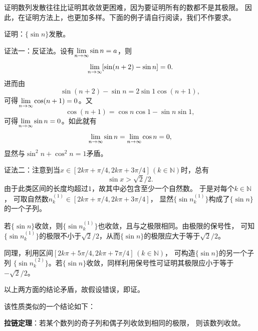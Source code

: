 \begin{shaded}
	证明数列发散往往比证明其收敛更困难，因为要证明所有的数都不是其极限。
	因此，在证明方法上，也更加多样。下面的例子请自行阅读，我们不作要求。

	\egz 证明：$\{\sin n\}$发散。

	
	证法一：反证法。设有$\lim\limits_{n\to\infty}\sin n=a$，则
	$$\lim\limits_{n\to\infty}[\sin(n+2)-\sin n]=0.$$
	进而由
	$$\sin(n+2)-\sin n=2\sin 1\cos(n+1),$$
	可得$\lim\limits_{n\to\infty}\cos(n+1)=0$。又
	$$\cos(n+1)=\cos n\cos 1-\sin n\sin 1,$$
	可得$\lim\limits_{n\to\infty}\sin n=0$。如此就有
	$$\lim\limits_{n\to\infty}\sin n=\lim\limits_{n\to\infty}\cos n=0,$$
	显然与$\sin^2n+\cos^2n=1$矛盾。\fin
	
	证法二：注意到当$x\in[2k\pi+\pi/4,2k\pi+3\pi/4]\,
	(k\in\mathbb{N})$时，总有
	$$\sin x>\sqrt2/2.$$
	由于此类区间的长度均超过$1$，故其中必包含至少一个自然数。
	于是对每个$k\in\mathbb{N}$，
	可取自然数$n^{(1)}_k\in[2k\pi+\pi/4,2k\pi+3\pi/4]$，
	显然$\{\sin{n^{(1)}_k}\}$构成了$\{\sin
	n\}$的一个子列。
	
	若$\{\sin n\}$收敛，则$\{\sin{n^{(1)}_k}\}$也收敛，且与之极限相同。由极限的保号性，
	可知$\{\sin{n^{(1)}_k}\}$的极限不小于$\sqrt2/2$，从而$\{\sin
	n\}$的极限应大于等于$\sqrt2/2$。
	
	同理，利用区间$[2k\pi+5\pi/4,2k\pi+7\pi/4]\,(k\in\mathbb{N})$，
	可构造$\{\sin n\}$的另一个子列 
	$\{\sin{n^{(2)}_k}\}$。若$\{\sin n\}$收敛，同样利用保号性可证明其极限应小于等于$-\sqrt2/2$。
	
	以上两方面的结论矛盾，故假设错误，即证。\fin
\end{shaded}

该性质类似的一个结论如下：
\begin{thx}
	{\bf 拉链定理}：若某个数列的奇子列和偶子列收敛到相同的极限，
	则该数列收敛。
\end{thx}


